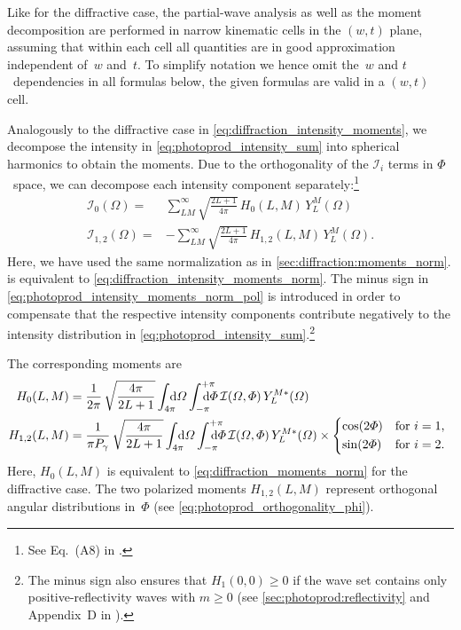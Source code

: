 Like for the diffractive case, the partial-wave analysis as well as
the moment decomposition are performed in narrow kinematic cells in
the $(w, t)$ plane, assuming that within each cell all quantities are
in good approximation independent of~$w$ and~$t$.  To simplify
notation we hence omit the~$w$ and $t$~dependencies in all formulas
below, \ie the given formulas are valid in a $(w, t)$ cell.

Analogously to the diffractive case in
\cref{eq:diffraction_intensity_moments}, we decompose the intensity in
\cref{eq:photoprod_intensity_sum} into spherical harmonics to obtain
the moments.  Due to the orthogonality of the $\mathcal{I}_i$ terms in
$\Phi$~space, we can decompose each intensity component
separately:\footnote{See Eq.~(A8) in .}
\begin{align}
  \label{eq:photoprod_intensity_moments_norm_unpol}
  \mathcal{I}_0(\Omega)
  ={}& \sum_{L M}^\infty \sqrt{\frac{2 L + 1}{4 \pi}}\, H_0(L, M)\, Y_L^M(\Omega)
  \\
  \label{eq:photoprod_intensity_moments_norm_pol}
  \mathcal{I}_{1, 2}(\Omega)
  ={}& -\sum_{L M}^\infty \sqrt{\frac{2 L + 1}{4 \pi}}\, H_{1, 2}(L, M)\, Y_L^M(\Omega).
\end{align}
Here, we have used the same normalization as in
\cref{sec:diffraction:moments_norm}.
 is equivalent to
\cref{eq:diffraction_intensity_moments_norm}.  The minus sign in
\cref{eq:photoprod_intensity_moments_norm_pol} is introduced in order
to compensate that the respective intensity components contribute
negatively to the intensity distribution in
\cref{eq:photoprod_intensity_sum}.\footnote{\label{fn:photoprod_intensity_sign}The
minus sign also ensures that $H_1(0, 0) \geq 0$ if the wave set
contains only positive-reflectivity waves with $m \geq 0$ (see
\cref{sec:photoprod:reflectivity} and Appendix~D in
).}

The corresponding moments are
\begin{align}
  \label{eq:photoprod_moment_norm_unpol}
  H_0(L, M)
  ={}& \frac{1}{2 \pi}\, \sqrt{\frac{4 \pi}{2 L + 1}} \int_{4 \pi}\!\!\!\! \dif{\Omega} \int_{-\pi}^{+\pi}\hspace{-1.2em} \dif{\Phi}\,
  \mathcal{I}(\Omega, \Phi)\, Y_L^{M *}(\Omega)
  \\
  \label{eq:photoprod_moments_norm_pol}
  H_{1, 2}(L, M)
  ={}& \frac{1}{\pi P_\gamma}\, \sqrt{\frac{4 \pi}{2 L + 1}} \int_{4 \pi}\!\!\!\! \dif{\Omega} \int_{-\pi}^{+\pi}\hspace{-1.2em} \dif{\Phi}\,
  \mathcal{I}(\Omega, \Phi)\, Y_L^{M *}(\Omega) \times \begin{cases*}
    \cos(2 \Phi) & for $i = 1$, \\
    \sin(2 \Phi) & for $i = 2$.
  \end{cases*}
\end{align}
Here, $H_0(L, M)$ is equivalent to \cref{eq:diffraction_moments_norm}
for the diffractive case.  The two polarized moments $H_{1, 2}(L, M)$
represent orthogonal angular distributions in~$\Phi$ (see
\cref{eq:photoprod_orthogonality_phi}).


